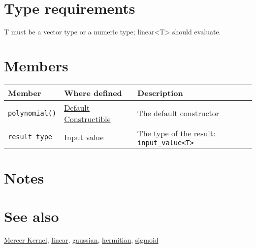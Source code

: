 \documentclass{article}
\begin{document}
\section*{Type requirements}

T must be a vector type or a numeric type; linear<T> should evaluate.


\section*{Members}

\begin{tabular}{lll}
\textbf{Member} & \textbf{Where defined} & \textbf{Description} \\ 
\hline
\texttt{polynomial()} & \href{http://www.sgi.com/tech/stl/DefaultConstructible.html}{Default Constructible} & The default constructor \\
\texttt{result_type} & Input value & The type of the result: \texttt{input_value<T>} \\
\end{tabular}

\section*{Notes}

\section*{See also}

\href{\kmlroot/mercer_kernel.html}{Mercer Kernel},
\href{\kmlroot/linear.html}{linear}, 
\href{\kmlroot/gaussian.html}{gaussian}, 
\href{\kmlroot/hermitian.html}{hermitian}, 
\href{\kmlroot/sigmoid.html}{sigmoid}



\end{document}
